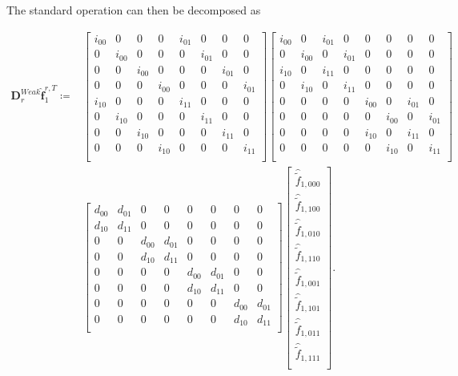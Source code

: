 \documentclass[12pt,Bold,letterpaper,TexShade]{mcgilletdclass}
\numberwithin{equation}{section}
\begin{document}
The standard operation can then be decomposed as

\begin{align*}
\boldsymbol D^{Weak}_r \hat{\boldsymbol f}^{r,T}_{1}
\coloneqq &
\begin{bmatrix}
i_{00} & 0 & 0 & 0 & i_{01} & 0 & 0 & 0 \\
0 & i_{00} & 0 & 0 & 0 & i_{01} & 0 & 0 \\
0 & 0 & i_{00} & 0 & 0 & 0 & i_{01} & 0 \\
0 & 0 & 0 & i_{00} & 0 & 0 & 0 & i_{01} \\
i_{10} & 0 & 0 & 0 & i_{11} & 0 & 0 & 0 \\
0 & i_{10} & 0 & 0 & 0 & i_{11} & 0 & 0 \\
0 & 0 & i_{10} & 0 & 0 & 0 & i_{11} & 0 \\
0 & 0 & 0 & i_{10} & 0 & 0 & 0 & i_{11} \\
\end{bmatrix}
\begin{bmatrix}
i_{00} & 0 & i_{01} & 0 & 0 & 0 & 0 & 0 \\
0 & i_{00} & 0 & i_{01} & 0 & 0 & 0 & 0 \\
i_{10} & 0 & i_{11} & 0 & 0 & 0 & 0 & 0 \\
0 & i_{10} & 0 & i_{11} & 0 & 0 & 0 & 0 \\
0 & 0 & 0 & 0 & i_{00} & 0 & i_{01} & 0 \\
0 & 0 & 0 & 0 & 0 & i_{00} & 0 & i_{01} \\
0 & 0 & 0 & 0 & i_{10} & 0 & i_{11} & 0 \\
0 & 0 & 0 & 0 & 0 & i_{10} & 0 & i_{11} \\
\end{bmatrix} \\
&
\begin{bmatrix}
d_{00} & d_{01} & 0 & 0 & 0 & 0 & 0 & 0 \\
d_{10} & d_{11} & 0 & 0 & 0 & 0 & 0 & 0 \\
0 & 0 & d_{00} & d_{01} & 0 & 0 & 0 & 0 \\
0 & 0 & d_{10} & d_{11} & 0 & 0 & 0 & 0 \\
0 & 0 & 0 & 0 & d_{00} & d_{01} & 0 & 0 \\
0 & 0 & 0 & 0 & d_{10} & d_{11} & 0 & 0 \\
0 & 0 & 0 & 0 & 0 & 0 & d_{00} & d_{01} \\
0 & 0 & 0 & 0 & 0 & 0 & d_{10} & d_{11} \\
\end{bmatrix}
\begin{bmatrix}
\hat{\tilde{f}}_{1,000} \\
\hat{\tilde{f}}_{1,100} \\
\hat{\tilde{f}}_{1,010} \\
\hat{\tilde{f}}_{1,110} \\
\hat{\tilde{f}}_{1,001} \\
\hat{\tilde{f}}_{1,101} \\
\hat{\tilde{f}}_{1,011} \\
\hat{\tilde{f}}_{1,111} \\
\end{bmatrix}.
\end{align*}
\end{document}
